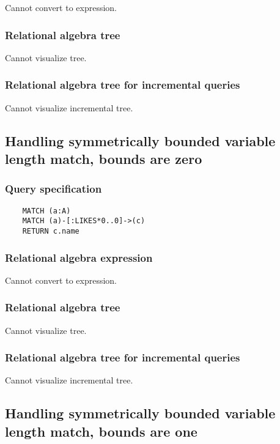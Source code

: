 	Cannot convert to expression.

	\subsubsection*{Relational algebra tree}

	Cannot visualize tree.

	\subsubsection*{Relational algebra tree for incremental queries}

	Cannot visualize incremental tree.
	\subsection{Handling symmetrically bounded variable length match, bounds are zero}

	\subsubsection*{Query specification}

	\begin{lstlisting}
	MATCH (a:A)
	MATCH (a)-[:LIKES*0..0]->(c)
	RETURN c.name
	\end{lstlisting}


	\subsubsection*{Relational algebra expression}

	Cannot convert to expression.

	\subsubsection*{Relational algebra tree}

	Cannot visualize tree.

	\subsubsection*{Relational algebra tree for incremental queries}

	Cannot visualize incremental tree.
	\subsection{Handling symmetrically bounded variable length match, bounds are one}

